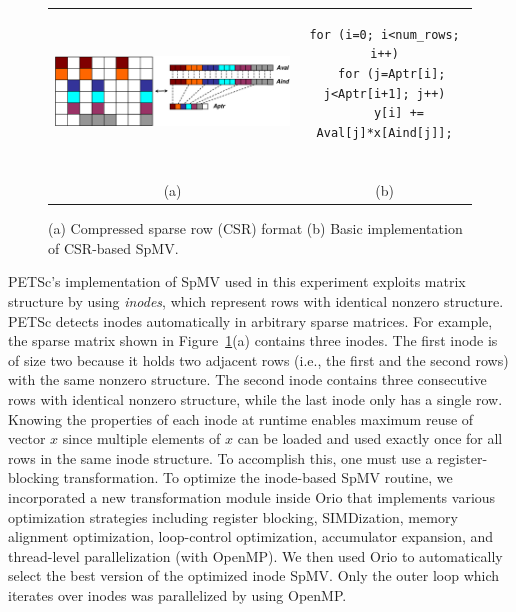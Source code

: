 \begin{figure}[tb]
\centering
\vspace{-.2in}
\begin{tabular}{cc}
\begin{minipage}[b]{.5\textwidth}
\centering
\includegraphics[width=.8\textwidth]{figures/spmv.eps}  
\end{minipage}
&
\begin{minipage}[b]{.5\textwidth}
\scriptsize
\begin{verbatim}
for (i=0; i<num_rows; i++)
  for (j=Aptr[i]; j<Aptr[i+1]; j++)
    y[i] += Aval[j]*x[Aind[j]];


\end{verbatim}
\end{minipage}\\
(a) & (b)\\
\end{tabular}
\vspace{-.2in}
\caption{(a) Compressed sparse row (CSR) format (b) Basic implementation of CSR-based SpMV.}
\label{fig:spmv}
\end{figure}

PETSc's implementation of SpMV used in this experiment exploits matrix
structure by using \textit{inodes}, which represent rows with identical
nonzero structure.  PETSc detects inodes automatically in arbitrary sparse
matrices. For example, the sparse matrix shown in Figure~\ref{fig:spmv}(a)
contains three inodes. The first inode is of size two because it holds two
adjacent rows (i.e., the first and the second rows) with the same nonzero
structure. The second inode contains three consecutive rows with identical
nonzero structure, while the last inode only has a single row. Knowing the
properties of each inode at runtime enables maximum reuse of vector $x$ since
multiple elements of $x$ can be loaded and used exactly once for all rows in
the same inode structure. To accomplish this, one must use a
register-blocking transformation. To optimize the inode-based SpMV routine,
we incorporated a new transformation module inside Orio that implements
various optimization strategies including register blocking, SIMDization,
memory alignment optimization, loop-control optimization, accumulator
expansion, and thread-level parallelization (with OpenMP). We then used Orio
to automatically select the best version of the optimized inode SpMV. Only
the outer loop which iterates over inodes was parallelized by using OpenMP.

